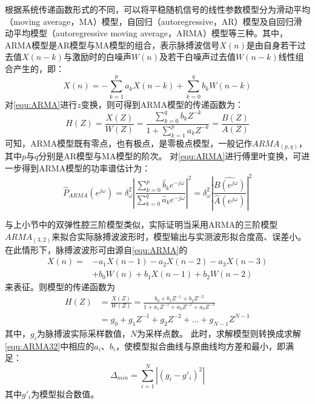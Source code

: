 根据系统传递函数形式的不同，可以将平稳随机信号的线性参数模型分为滑动平均（moving average，MA）模型，自回归（autoregressive，AR）模型及自回归滑动平均模型（autoregressive moving average，ARMA）模型等三种。其中，
ARMA模型是AR模型与MA模型的组合，表示脉搏波信号$X(n)$是由自身若干过去值$X(n-k)$与激励时的白噪声$W(n)$及若干白噪声过去值$W(n-k)$线性组合产生的，即：
\begin{equation}
    \label{equ:ARMA}
    X(n)=-\sum_{k=1}^{p}a_{k}X(n-k)+\sum_{k=0}^{q}b_{k}W(n-k)
\end{equation}
对\autoref{equ:ARMA}进行$z$变换，则可得到ARMA模型的传递函数为：
\begin{equation}
    \label{equ:ARMAH}
    H(Z)=\frac{X(Z)}{W(Z)}=\frac{\sum_{k=0}^{q}b_{k}Z^{-k}}{1+\sum_{k=1}^{p}a_{k}Z^{-k}}=\frac{B(Z)}{A(Z)}
\end{equation}
可知，ARMA模型既有零点，也有极点，是零极点模型，一般记作$ARMA_{(p,q)}$，其中$p$与$q$分别是AR模型与MA模型的阶次。
对\autoref{equ:ARMA}进行傅里叶变换，可进一步得到ARMA模型的功率谱估计为\cite{Qiu2012}：
\begin{equation}
    \label{equ:ARMAP}
    \hat{P}_{ARMA}(e^{j\omega} )=
    \delta _{\omega}^2\left |  \frac{\sum_{k=0}^{p}\hat{b}_{k}e^{-j\omega}}{\sum_{k=0}^{q}\hat{a}_{k}e^{-j\omega}}\right |^2
    =\delta _{\omega}^2\left |  \frac{\hat{B(e^{j\omega} )}}{\hat{A}(e^{j\omega} )}\right |^2
\end{equation}

与上小节中的双弹性腔三阶模型类似，实际证明当采用ARMA的三阶模型$ARMA_{(3,2)}$来拟合实际脉搏波波形时，模型输出与实测波形拟合度高、误差小\cite{PPGYY}。在此情形下，脉搏波波形可由源自\autoref{equ:ARMA}的
\begin{equation}
    \label{equ:ARMA32}
    \begin{aligned}
        X(n)=&-a_{1}X(n-1)-a_{2}X(n-2)-a_{3}X(n-3)\\
        &+b_{0}W(n)+b_{1}X(n-1)+b_{2}W(n-2)
    \end{aligned}
\end{equation}
来表征。则模型的传递函数为
\begin{equation}
    \label{equ:ARMAH32}
    \begin{aligned}
        H(Z)&=\frac{X(Z)}{W(Z)}=\frac{b_{0}+b_{1}Z^{-1}+b_{2}Z^{-2}}{1+a_{1}Z^{-1}+a_{2}Z^{-2}+a_{3}Z^{-3}}\\
        &=g_{0}+g_{1}Z^{-1}+g_{2}Z^{-2}+...+g_{N-1}Z^{N-1}
    \end{aligned}
\end{equation}
其中，$g_{i}$为脉搏波实际采样数值，$N$为采样点数。
此时，求解模型则转换成求解\autoref{equ:ARMA32}中相应的$a_{i}$、$b_{i}$，使模型拟合曲线与原曲线均方差和最小，即满足：
\begin{equation}
    \label{equ:MeanSum}
    \Delta_{min}=\sum_{i=1}^{N}\left |  (g_i-g'_i)^2\right |
\end{equation}
其中$g'_i$为模型拟合数值。

